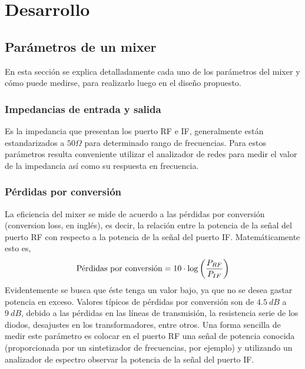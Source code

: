 \documentclass[a4paper,10pt]{article}
\begin{document}
\newpage
\section{Desarrollo}
	\subsection{Parámetros de un mixer}
	En esta secci\'on se explica detalladamente cada uno de los par\'ametros del mixer y c\'omo puede medirse, para realizarlo luego en el dise\~no propuesto.
		\subsubsection{Impedancias de entrada y salida}
		Es la impedancia que presentan los puerto RF e IF, generalmente est\'an estandarizados a $50\Omega$ para determinado rango de frecuencias. Para estos par\'ametros resulta conveniente utilizar el analizador de redes para medir el valor de la impedancia as\'i como su respuesta en frecuencia.
		\subsubsection{P\'erdidas por conversi\'on}
		\indent La eficiencia del mixer se mide de acuerdo a las p\'erdidas por conversi\'on (conversion loss, en ingl\'es), es decir, la 
		relación entre la potencia de la señal del puerto RF con respecto a la potencia de la señal del puerto IF. Matem\'aticamente esto es,
		$$\textmd{P\'erdidas por conversi\'on}=10\cdot\log\left(\frac{P_{RF}}{P_{IF}}\right)$$
		Evidentemente se busca que \'este tenga un valor bajo, ya que no se desea gastar potencia en exceso. Valores t\'ipicos de p\'erdidas por conversi\'on son de $4.5~dB$ a $9~dB$, debido a las p\'erdidas en las l\'ineas de transmisi\'on, la resistencia serie de los diodos, desajustes en los transformadores, entre otros.
		Una forma sencilla de medir este par\'ametro es colocar en el puerto RF una señal de potencia conocida (proporcionada por un sintetizador de frecuencias, por ejemplo) y utilizando un analizador de espectro observar la potencia de la señal del puerto IF.
		
\end{document}
